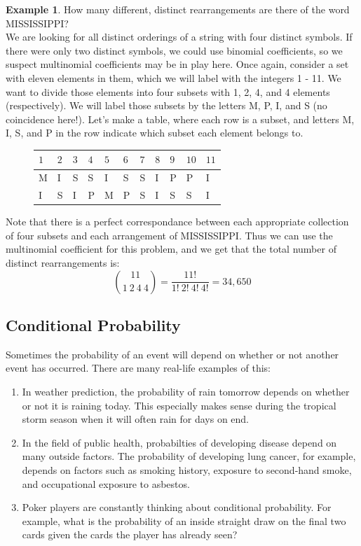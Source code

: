 \documentclass[12pt]{article}
\theoremstyle{definition}
\newtheorem*{example}{Example}
\theoremstyle{remark}
\begin{document}
\begin{example}How many different, distinct rearrangements are there of the word MISSISSIPPI?\\

We are looking for all distinct orderings of a string with four distinct symbols. If there were only two distinct symbols, we could use binomial coefficients, so we suspect multinomial coefficients may be in play here. Once again, consider a set with eleven elements in them, which we will label with the integers 1 - 11. We want to divide those elements into four subsets with 1, 2, 4, and 4 elements (respectively). We will label those subsets by the letters M, P, I, and S (no coincidence here!). Let's make a table, where each row is a subset, and letters M, I, S, and P in the row indicate which subset each element belongs to.

\begin{figure}[H]
\centering
\label{mississippi}
\begin{tabular}{lllllllllll}
$1$ & $2$ & $3$ & $4$ & $5$ & $6$ & $7$ & $8$ & $9$ & $10$ & $11$ \\
\hline
M & I & S & S & I & S & S & I & P & P & I \\
I & S & I & P & M & P & S & I & S & S & I \\
\end{tabular}
\end{figure} 

Note that there is a perfect correspondance between each appropriate collection of four subsets and each arrangement of MISSISSIPPI. Thus we can use the multinomial coefficient for this problem, and we get that the total number of distinct rearrangements is:
\[
\binom{11}{1 \: 2\: 4 \: 4} = \frac{11!}{1!\:2!\:4!\:4!} = 34,650
\]
\end{example}

\subsection{Conditional Probability}
Sometimes the probability of an event will depend on whether or not another event has occurred. There are many real-life examples of this:
\begin{enumerate}
\item In weather prediction, the probability of rain tomorrow depends on whether or not it is raining today. This especially makes sense during the tropical storm season when it will often rain for days on end.
\item In the field of public health, probabilties of developing disease depend on many outside factors. The probability of developing lung cancer, for example, depends on factors such as smoking history, exposure to second-hand smoke, and occupational exposure to asbestos.
\item Poker players are constantly thinking about conditional probability. For example, what is the probability of an inside straight draw on the final two cards given the cards the player has already seen?
\end{enumerate}
\end{document}
